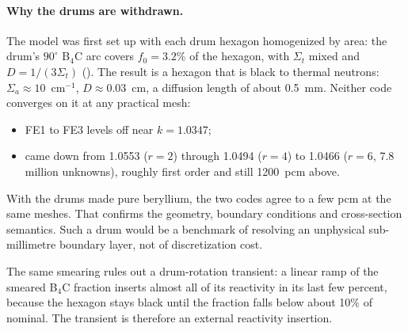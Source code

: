 \paragraph{Why the drums are withdrawn.}\label{sec:blackdrum} The model was
first set up with each drum hexagon homogenized by area: the drum's $90^\circ$
B$_4$C arc covers $f_0 = 3.2$\% of the hexagon, with $\Sigma_t$ mixed and
$D = 1/(3\Sigma_t)$ (). The result is a hexagon that
is black to thermal neutrons: $\Sigma_a \approx 10$~cm$^{-1}$,
$D \approx 0.03$~cm, a diffusion length of about 0.5~mm. Neither code
converges on it at any practical mesh:
\begin{itemize}
\item \ffn{} FE1 to FE3 levels off near $k = 1.0347$;
\item \garnet{} came down from 1.0553 ($r=2$) through 1.0494 ($r=4$) to
  1.0466 ($r=6$, 7.8 million unknowns), roughly first order and still
  1200~pcm above.
\end{itemize}
With the drums made pure beryllium, the two codes agree to a few pcm at the
same meshes. That confirms the geometry, boundary conditions and cross-section
semantics. Such a drum would be a benchmark of resolving an unphysical
sub-millimetre boundary layer, not of discretization cost.

The same smearing rules out a drum-rotation transient: a linear ramp of the
smeared B$_4$C fraction inserts almost all of its reactivity in its last few
percent, because the hexagon stays black until the fraction falls below about
10\% of nominal. The transient is therefore an external reactivity insertion.
